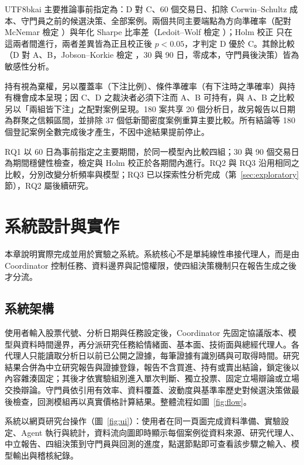 \documentclass[12pt,a4paper]{article}
\newcommand{\grp}[1]{\textsf{#1}}
\begin{document}
\begin{CJK}{UTF8}{bkai}
主要推論事前指定為：\grp{D} 對 \grp{C}、60 個交易日、扣除 Corwin--Schultz 成本、守門員之前的候選決策、全部案例。兩個共同主要端點為方向準確率（配對 McNemar 檢定 \citep{mcnemar1947}）與年化 Sharpe 比率差（Ledoit--Wolf 檢定 \citep{ledoit2008sharpe}）；Holm 校正 \citep{holm1979} 只在這兩者間進行，兩者差異皆為正且校正後 $p<0.05$，才判定 \grp{D} 優於 \grp{C}。其餘比較（\grp{D} 對 \grp{A}、\grp{B}，Jobson--Korkie 檢定 \citep{jobson1981sharpe}，30 與 90 日，零成本，守門員後決策）皆為敏感性分析。

持有視為棄權，另以覆蓋率（下注比例）、條件準確率（有下注時之準確率）與持有機會成本呈現；因 \grp{C}、\grp{D} 之裁決者必須下注而 \grp{A}、\grp{B} 可持有，與 \grp{A}、\grp{B} 之比較另以「兩組皆下注」之配對案例呈現。180 案共享 20 個分析日，故另報告以日期為群聚之信賴區間，並排除 37 個低新聞密度案例重算主要比較。所有結論等 180 個登記案例全數完成後才產生，不因中途結果提前停止。

RQ1 以 60 日為事前指定之主要期間，於同一模型內比較四組；30 與 90 個交易日為期間穩健性檢查，檢定與 Holm 校正於各期間內進行。RQ2 與 RQ3 沿用相同之比較，分別改變分析頻率與模型；RQ3 已以探索性分析完成（第~\ref{sec:exploratory} 節），RQ2 屬後續研究。

\section{系統設計與實作}
\label{sec:system}

本章說明實際完成並用於實驗之系統。系統核心不是單純線性串接代理人，而是由 Coordinator 控制任務、資料邊界與記憶權限，使四組決策機制只在報告生成之後才分流。

\subsection{系統架構}

使用者輸入股票代號、分析日期與任務設定後，Coordinator 先固定協議版本、模型與資料時間邊界，再分派研究任務給情緒面、基本面、技術面與總經代理人。各代理人只能讀取分析日以前已公開之證據，每筆證據有識別碼與可取得時間。研究結果合併為中立研究報告與證據登錄，報告不含買進、持有或賣出結論，鎖定後以內容雜湊固定；其後才依實驗組別進入單次判斷、獨立投票、固定立場辯論或立場交換辯論。守門員依引用有效率、資料覆蓋、波動度與基準率歷史對候選決策做最後檢查，回測模組再以真實價格計算結果。整體流程如圖~\ref{fig:flow}。

系統以網頁研究台操作（圖~\ref{fig:ui}）：使用者在同一頁面完成資料準備、實驗設定、Agent 執行與統計，資料流向圖即時顯示每個案例從資料來源、研究代理人、中立報告、四組決策到守門員與回測的進度，點選節點即可查看該步驟之輸入、模型輸出與稽核紀錄。


\end{CJK}
\end{document}
